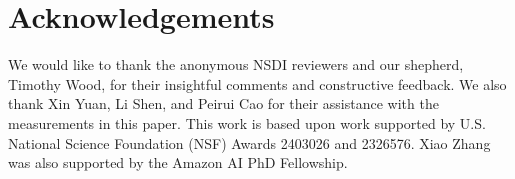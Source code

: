 \section*{Acknowledgements}
We would like to thank the anonymous NSDI reviewers and our shepherd, Timothy Wood, for their insightful comments and constructive feedback.
We also thank Xin Yuan, Li Shen, and Peirui Cao for their assistance with the measurements in this paper.
This work is based upon work supported by U.S. National Science Foundation (NSF) Awards 2403026 and 2326576.
Xiao Zhang was also supported by the Amazon AI PhD Fellowship.
